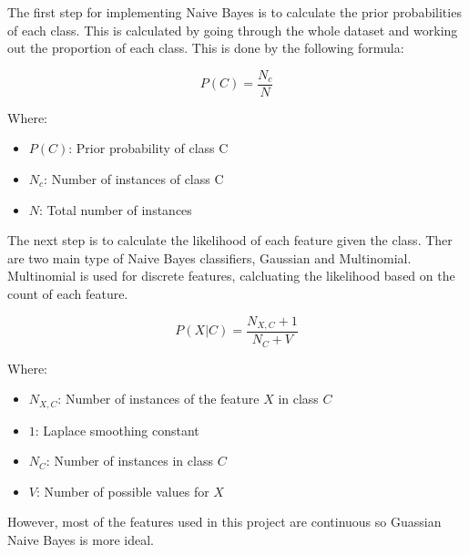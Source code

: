 The first step for implementing Naive Bayes is to calculate the prior probabilities of each class. This is calculated by going through the whole dataset and working out the proportion of each class. This is done by the following formula:

\begin{equation}
    \label{eq:prior}
    P(C) = \frac{N_c}{N}
\end{equation}

Where:
\begin{itemize}
    \item $P(C)$: Prior probability of class C
    \item $N_c$: Number of instances of class C
    \item $N$: Total number of instances
\end{itemize}

The next step is to calculate the likelihood of each feature given the class. Ther are two main type of Naive Bayes classifiers, Gaussian and Multinomial. Multinomial is used for discrete features, calcluating the likelihood based on the count of each feature. 

\begin{equation}
    \label{eq:multinomial}
    P(X | C) = \frac{N_{X,C} + 1}{N_C + V}
\end{equation}

Where:
\begin{itemize}
    \item $N_{X,C}$: Number of instances of the feature $X$ in class $C$
    \item $1$: Laplace smoothing constant
    \item $N_C$: Number of instances in class $C$
    \item $V$: Number of possible values for $X$
\end{itemize}

However, most of the features used in this project are continuous so Guassian Naive Bayes is more ideal. 